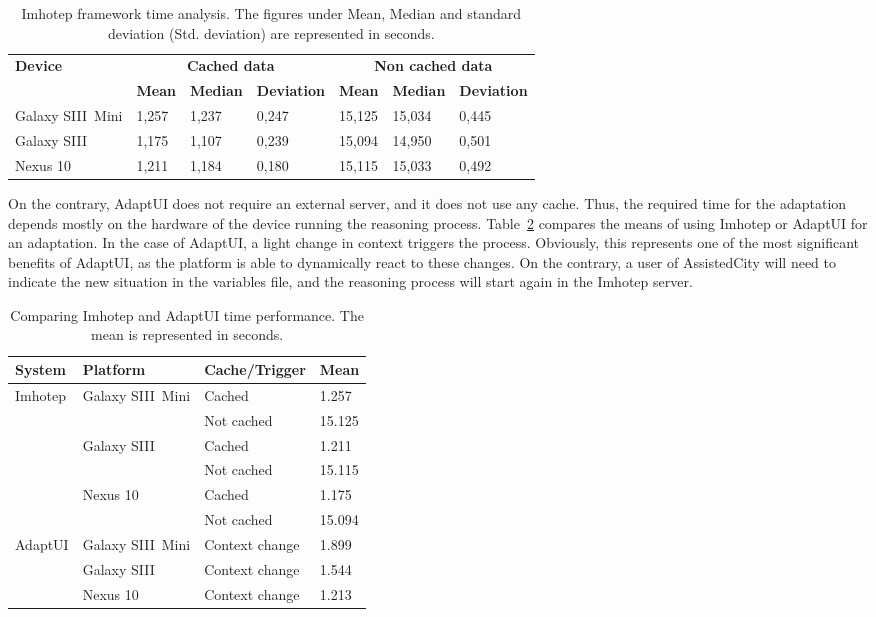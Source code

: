 \begin{table}
 \caption{Imhotep framework time analysis. The figures under Mean, Median and
 standard deviation (Std. deviation) are represented in seconds.}
 \label{tbl:imhotep_timing}
 \footnotesize
 \centering
\begin{tabular}{l l l l l l l}
  \hline 
  \textbf{Device} & \multicolumn{3}{c}{\textbf{Cached 
  data}} & \multicolumn{3}{c}{\textbf{Non cached data}}\\
  & \textbf{Mean} & \textbf{Median} & \textbf{Deviation} &  \textbf{Mean} 
  & \textbf{Median} & \textbf{Deviation}\\
  \hline    
  Galaxy SIII~Mini & 1,257 & 1,237 & 0,247 & 15,125 & 15,034 & 0,445\\
%   
  Galaxy SIII & 1,175 & 1,107 & 0,239 & 15,094 & 14,950 & 0,501 	\\
%   
  Nexus 10 & 1,211 & 1,184 & 0,180 & 15,115 & 15,033 & 0,492 	\\
 \hline
\end{tabular}
\end{table}

On the contrary, AdaptUI does not require an external server, and it does not 
use any cache. Thus, the required time for the adaptation depends mostly on the 
hardware of the device running the reasoning process. Table~\ref{tbl:imhotep_vs_adaptui}
compares the means of using Imhotep or AdaptUI for an adaptation. In the case of 
AdaptUI, a light change in context triggers the process. Obviously, this represents
one of the most significant benefits of AdaptUI, as the platform is able to 
dynamically react to these changes. On the contrary, a user of AssistedCity will
need to indicate the new situation in the variables file, and the reasoning process
will start again in the Imhotep server.

\begin{table}
 \caption{Comparing Imhotep and AdaptUI time performance. The mean is 
represented in seconds.}
 \label{tbl:imhotep_vs_adaptui}
 \footnotesize
 \centering
\begin{tabular}{l l l l}
  \hline 
  \textbf{System} & \textbf{Platform} & \textbf{Cache/Trigger} & \textbf{Mean}\\
  \hline
  Imhotep 	& Galaxy SIII~Mini	& Cached		& 1.257\\
		&  			& Not cached		& 15.125\\
		& Galaxy SIII 		& Cached		& 1.211\\
		&  			& Not cached		& 15.115\\
		& Nexus 10 		& Cached		& 1.175\\
		&  			& Not cached		& 15.094\\
  \hline
  AdaptUI 	& Galaxy SIII~Mini	& Context change	& 1.899\\
		& Galaxy SIII		& Context change	& 1.544\\
 		& Nexus 10 		& Context change	& 1.213\\
  \hline
\end{tabular}
\end{table}

